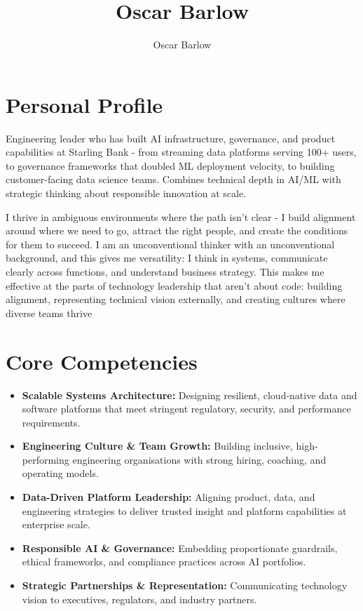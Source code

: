 \documentclass[a4paper]{scrartcl}
\author{Oscar Barlow}
\title{Oscar Barlow}
\date{}
\begin{document}
\maketitle

\section*{Personal Profile}
 { %
  \setlength{\parskip}{6pt plus 2pt minus 1pt}
  Engineering leader who has built AI infrastructure, governance, and product capabilities at Starling Bank - from streaming data platforms serving 100+ users, to governance frameworks that doubled ML deployment velocity, to building customer-facing data science teams. Combines technical depth in AI/ML with strategic thinking about responsible innovation at scale.

  I thrive in ambiguous environments where the path isn't clear - I build alignment around where we need to go, attract the right people, and create the conditions for them to succeed. I am an unconventional thinker with an unconventional background, and this gives me versatility: I think in systems, communicate clearly across functions, and understand business strategy. This makes me effective at the parts of technology leadership that aren't about code: building alignment, representing technical vision externally, and creating cultures where diverse teams thrive
 } %

\section*{Core Competencies}
\begin{itemize}
	\item \textbf{Scalable Systems Architecture:} Designing resilient, cloud-native data and software platforms that meet stringent regulatory, security, and performance requirements.
	\item \textbf{Engineering Culture \& Team Growth:} Building inclusive, high-performing engineering organisations with strong hiring, coaching, and operating models.
	\item \textbf{Data-Driven Platform Leadership:} Aligning product, data, and engineering strategies to deliver trusted insight and platform capabilities at enterprise scale.
	\item \textbf{Responsible AI \& Governance:} Embedding proportionate guardrails, ethical frameworks, and compliance practices across AI portfolios.
	\item \textbf{Strategic Partnerships \& Representation:} Communicating technology vision to executives, regulators, and industry partners.
\end{itemize}
\end{document}
